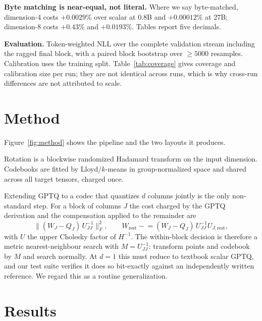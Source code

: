 \documentclass[11pt]{article}
\begin{document}
\textbf{Byte matching is near-equal, not literal.} Where we say byte-matched,
dimension-4 costs $+0.0029\%$ over scalar at 0.8B and $+0.00012\%$ at 27B;
dimension-8 costs $+0.43\%$ and $+0.0193\%$. Tables report five decimals.

\textbf{Evaluation.} Token-weighted NLL over the complete validation stream
including the ragged final block, with a paired block bootstrap over
$\ge 5000$ resamples. Calibration uses the training split. Table~\ref{tab:coverage}
gives coverage and calibration size per run; they are not identical across runs,
which is why cross-run differences are not attributed to scale.





\section{Method}
\label{sec:method}

Figure~\ref{fig:method} shows the pipeline and the two layouts it produces.

Rotation is a blockwise randomized Hadamard transform on the input dimension.
Codebooks are fitted by Lloyd/$k$-means in group-normalized space and shared
across all target tensors, charged once.

Extending GPTQ to a codec that quantizes $d$ columns jointly is the only
non-standard step. For a block of columns $J$ the cost charged by the GPTQ
derivation and the compensation applied to the remainder are
\[
\|(W_J-Q_J)\,U_{JJ}^{-1}\|_F^2,
\qquad
W_{\text{rest}} \mathrel{-}= (W_J-Q_J)\,U_{JJ}^{-1}U_{J,\text{rest}},
\]
with $U$ the upper Cholesky factor of $H^{-1}$. The within-block decision is
therefore a metric nearest-neighbour search with $M = U_{JJ}^{-1}$: transform
points and codebook by $M$ and search normally. At $d=1$ this must reduce to
textbook scalar GPTQ, and our test suite verifies it does so bit-exactly against
an independently written reference. We regard this as a routine generalization.

\section{Results}
\label{sec:results}








\end{document}
